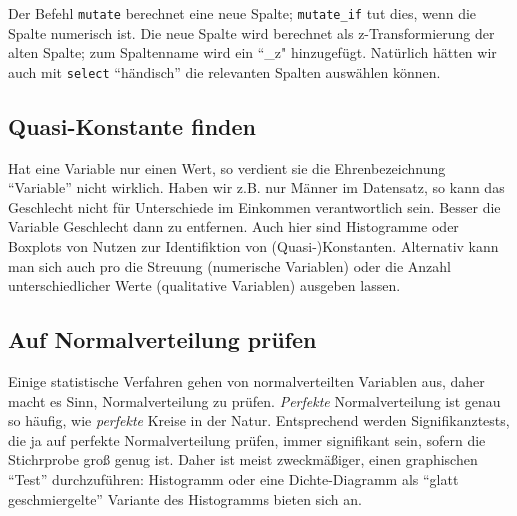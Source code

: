 \documentclass[12pt,]{book}
\makeatletter
\newenvironment{Shaded}{\begin{snugshade}}{\end{snugshade}}
\newcommand{\KeywordTok}[1]{\textcolor[rgb]{0.13,0.29,0.53}{\textbf{{#1}}}}
\newcommand{\DataTypeTok}[1]{\textcolor[rgb]{0.13,0.29,0.53}{{#1}}}
\newcommand{\DecValTok}[1]{\textcolor[rgb]{0.00,0.00,0.81}{{#1}}}
\newcommand{\StringTok}[1]{\textcolor[rgb]{0.31,0.60,0.02}{{#1}}}
\newcommand{\NormalTok}[1]{{#1}}
\newenvironment{kframe}{%
\medskip{}
\setlength{\fboxsep}{.8em}
 \def\at@end@of@kframe{}%
 \ifinner\ifhmode%
  \def\at@end@of@kframe{\end{minipage}}%
  \begin{minipage}{\columnwidth}%
 \fi\fi%
 \def\FrameCommand##1{\hskip\@totalleftmargin \hskip-\fboxsep
 \colorbox{shadecolor}{##1}\hskip-\fboxsep
     \hskip-\linewidth \hskip-\@totalleftmargin \hskip\columnwidth}%
 \MakeFramed {\advance\hsize-\width
   \@totalleftmargin\z@ \linewidth\hsize
   \@setminipage}}%
 {\par\unskip\endMakeFramed%
 \at@end@of@kframe}
\renewenvironment{Shaded}{\begin{kframe}}{\end{kframe}}
\makeatother
\begin{document}
Der Befehl \texttt{mutate} berechnet eine neue Spalte;
\texttt{mutate\_if} tut dies, wenn die Spalte numerisch ist. Die neue
Spalte wird berechnet als z-Transformierung der alten Spalte; zum
Spaltenname wird ein ``\_z" hinzugefügt. Natürlich hätten wir auch mit
\texttt{select} ``händisch'' die relevanten Spalten auswählen können.

\subsection{Quasi-Konstante finden}\label{quasi-konstante-finden}

Hat eine Variable nur einen Wert, so verdient sie die Ehrenbezeichnung
``Variable'' nicht wirklich. Haben wir z.B. nur Männer im Datensatz, so
kann das Geschlecht nicht für Unterschiede im Einkommen verantwortlich
sein. Besser die Variable Geschlecht dann zu entfernen. Auch hier sind
Histogramme oder Boxplots von Nutzen zur Identifiktion von
(Quasi-)Konstanten. Alternativ kann man sich auch pro die Streuung
(numerische Variablen) oder die Anzahl unterschiedlicher Werte
(qualitative Variablen) ausgeben lassen.

\subsection{Auf Normalverteilung
prüfen}\label{auf-normalverteilung-prufen}

Einige statistische Verfahren gehen von normalverteilten Variablen aus,
daher macht es Sinn, Normalverteilung zu prüfen. \emph{Perfekte}
Normalverteilung ist genau so häufig, wie \emph{perfekte} Kreise in der
Natur. Entsprechend werden Signifikanztests, die ja auf perfekte
Normalverteilung prüfen, immer signifikant sein, sofern die Stichrprobe
groß genug ist. Daher ist meist zweckmäßiger, einen graphischen ``Test''
durchzuführen: Histogramm oder eine Dichte-Diagramm als ``glatt
geschmiergelte'' Variante des Histogramms bieten sich an.

\begin{Shaded}
\end{Shaded}
\end{document}
